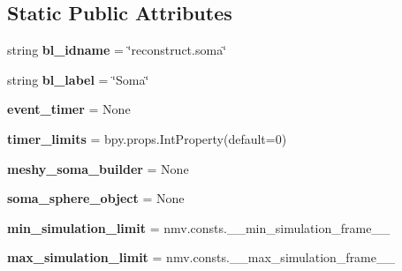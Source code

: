 \subsection*{Static Public Attributes}
\begin{DoxyCompactItemize}
\item 
string {\bfseries bl\+\_\+idname} = \char`\"{}reconstruct.\+soma\char`\"{}\hypertarget{classui__soft__body__panel_1_1ReconstructSomaOperator_aebf7fa1c8b3f60b1042a978f85818afe}{}\label{classui__soft__body__panel_1_1ReconstructSomaOperator_aebf7fa1c8b3f60b1042a978f85818afe}

\item 
string {\bfseries bl\+\_\+label} = \char`\"{}Soma\char`\"{}\hypertarget{classui__soft__body__panel_1_1ReconstructSomaOperator_a35501439de1d83a879408e7143c670ea}{}\label{classui__soft__body__panel_1_1ReconstructSomaOperator_a35501439de1d83a879408e7143c670ea}

\item 
{\bfseries event\+\_\+timer} = None\hypertarget{classui__soft__body__panel_1_1ReconstructSomaOperator_a9f33728dbfc3732cbec9fe18e91b9e85}{}\label{classui__soft__body__panel_1_1ReconstructSomaOperator_a9f33728dbfc3732cbec9fe18e91b9e85}

\item 
{\bfseries timer\+\_\+limits} = bpy.\+props.\+Int\+Property(default=0)\hypertarget{classui__soft__body__panel_1_1ReconstructSomaOperator_ad2d2e2a37993612a43654c66a9e2e1ed}{}\label{classui__soft__body__panel_1_1ReconstructSomaOperator_ad2d2e2a37993612a43654c66a9e2e1ed}

\item 
{\bfseries meshy\+\_\+soma\+\_\+builder} = None\hypertarget{classui__soft__body__panel_1_1ReconstructSomaOperator_a4a4a8187dfdad33e5648546b01589764}{}\label{classui__soft__body__panel_1_1ReconstructSomaOperator_a4a4a8187dfdad33e5648546b01589764}

\item 
{\bfseries soma\+\_\+sphere\+\_\+object} = None\hypertarget{classui__soft__body__panel_1_1ReconstructSomaOperator_aaa5c03be8dec695825cdfbf9ef5ef6b0}{}\label{classui__soft__body__panel_1_1ReconstructSomaOperator_aaa5c03be8dec695825cdfbf9ef5ef6b0}

\item 
{\bfseries min\+\_\+simulation\+\_\+limit} = nmv.\+consts.\+\_\+\+\_\+min\+\_\+simulation\+\_\+frame\+\_\+\+\_\+\hypertarget{classui__soft__body__panel_1_1ReconstructSomaOperator_ad363a78a4f55d7928bce38fddcc54793}{}\label{classui__soft__body__panel_1_1ReconstructSomaOperator_ad363a78a4f55d7928bce38fddcc54793}

\item 
{\bfseries max\+\_\+simulation\+\_\+limit} = nmv.\+consts.\+\_\+\+\_\+max\+\_\+simulation\+\_\+frame\+\_\+\+\_\+\hypertarget{classui__soft__body__panel_1_1ReconstructSomaOperator_a9d05e028149d9a255c08fee5549539bd}{}\label{classui__soft__body__panel_1_1ReconstructSomaOperator_a9d05e028149d9a255c08fee5549539bd}

\end{DoxyCompactItemize}


